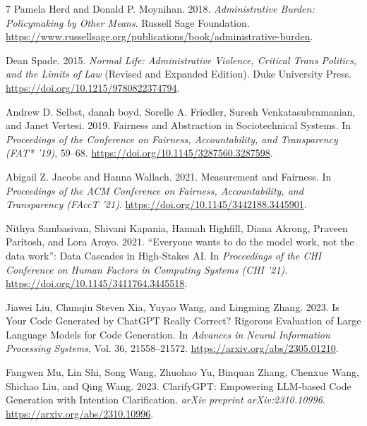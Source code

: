 \documentclass[manuscript,screen,review,anonymous]{acmart}
\begin{document}
\clearpage
\begin{thebibliography}{7}
Pamela Herd and Donald P. Moynihan. 2018.
\emph{Administrative Burden: Policymaking by Other Means}.
Russell Sage Foundation.
\url{https://www.russellsage.org/publications/book/administrative-burden}.

Dean Spade. 2015.
\emph{Normal Life: Administrative Violence, Critical Trans Politics, and the Limits of Law} (Revised and Expanded Edition).
Duke University Press.
\url{https://doi.org/10.1215/9780822374794}.

Andrew D. Selbst, danah boyd, Sorelle A. Friedler, Suresh Venkatasubramanian, and Janet Vertesi. 2019.
Fairness and Abstraction in Sociotechnical Systems.
In \emph{Proceedings of the Conference on Fairness, Accountability, and Transparency (FAT* '19)}, 59--68.
\url{https://doi.org/10.1145/3287560.3287598}.

Abigail Z. Jacobs and Hanna Wallach. 2021.
Measurement and Fairness.
In \emph{Proceedings of the ACM Conference on Fairness, Accountability, and Transparency (FAccT '21)}.
\url{https://doi.org/10.1145/3442188.3445901}.

Nithya Sambasivan, Shivani Kapania, Hannah Highfill, Diana Akrong, Praveen Paritosh, and Lora Aroyo. 2021.
``Everyone wants to do the model work, not the data work'': Data Cascades in High-Stakes AI.
In \emph{Proceedings of the CHI Conference on Human Factors in Computing Systems (CHI '21)}.
\url{https://doi.org/10.1145/3411764.3445518}.

Jiawei Liu, Chunqiu Steven Xia, Yuyao Wang, and Lingming Zhang. 2023.
Is Your Code Generated by ChatGPT Really Correct? Rigorous Evaluation of Large Language Models for Code Generation.
In \emph{Advances in Neural Information Processing Systems}, Vol. 36, 21558--21572.
\url{https://arxiv.org/abs/2305.01210}.

Fangwen Mu, Lin Shi, Song Wang, Zhuohao Yu, Binquan Zhang, Chenxue Wang, Shichao Liu, and Qing Wang. 2023.
ClarifyGPT: Empowering LLM-based Code Generation with Intention Clarification.
\emph{arXiv preprint arXiv:2310.10996}.
\url{https://arxiv.org/abs/2310.10996}.
\end{thebibliography}
\end{document}
